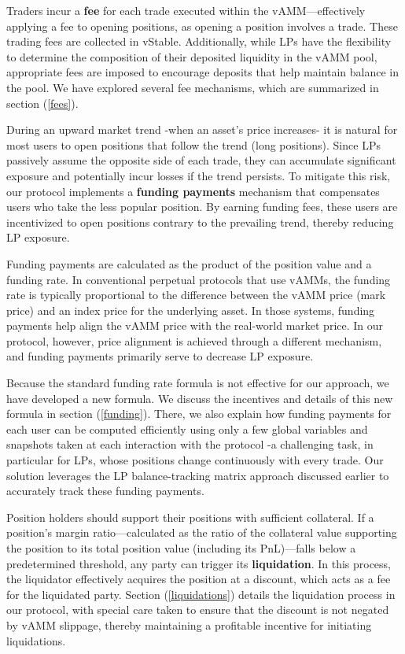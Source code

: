 \documentclass{article}
\begin{document}
Traders incur a \textbf{fee} for each trade executed within the vAMM—effectively applying a fee to opening positions, as opening a position involves a trade. These trading fees are collected in vStable. Additionally, while LPs have the flexibility to determine the composition of their deposited liquidity in the vAMM pool, appropriate fees are imposed to encourage deposits that help maintain balance in the pool. We have explored several fee mechanisms, which are summarized in section (\ref{fees}).

During an upward market trend -when an asset’s price increases- it is natural for most users to open positions that follow the trend (long positions). Since LPs passively assume the opposite side of each trade, they can accumulate significant exposure and potentially incur losses if the trend persists. To mitigate this risk, our protocol implements a \textbf{funding payments} mechanism that compensates users who take the less popular position. By earning funding fees, these users are incentivized to open positions contrary to the prevailing trend, thereby reducing LP exposure.

Funding payments are calculated as the product of the position value and a funding rate. In conventional perpetual protocols that use vAMMs, the funding rate is typically proportional to the difference between the vAMM price (mark price) and an index price for the underlying asset. In those systems, funding payments help align the vAMM price with the real-world market price. In our protocol, however, price alignment is achieved through a different mechanism, and funding payments primarily serve to decrease LP exposure.

Because the standard funding rate formula is not effective for our approach, we have developed a new formula. We discuss the incentives and details of this new formula in section (\ref{funding}). There, we also explain how funding payments for each user can be computed efficiently using only a few global variables and snapshots taken at each interaction with the protocol -a challenging task, in particular for LPs, whose positions change continuously with every trade. Our solution leverages the LP balance-tracking matrix approach discussed earlier to accurately track these funding payments.

Position holders should support their positions with sufficient collateral. If a position’s margin ratio—calculated as the ratio of the collateral value supporting the position to its total position value (including its PnL)—falls below a predetermined threshold, any party can trigger its \textbf{liquidation}. In this process, the liquidator effectively acquires the position at a discount, which acts as a fee for the liquidated party. Section (\ref{liquidations}) details the liquidation process in our protocol, with special care taken to ensure that the discount is not negated by vAMM slippage, thereby maintaining a profitable incentive for initiating liquidations.
\end{document}
